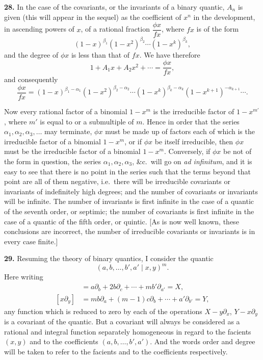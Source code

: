 \documentclass[11pt]{article}
\begin{document}
\textbf{28.} In the case of the covariants, or the invariants of a binary quantic, $A_n$ is given (this will appear in the sequel) as the coefficient of $x^n$ in the development, in ascending powers of $x$, of a rational fraction $\dfrac{\phi x}{f x}$, where $f x$ is of the form
\[
(1 - x)^{\beta_1}(1 - x^2)^{\beta_2}\cdots(1 - x^k)^{\beta_k},
\]
and the degree of $\phi x$ is less than that of $f x$. We have therefore
\[
1 + A_1 x + A_2 x^2 + \cdots = \frac{\phi x}{f x},
\]
and consequently
\[
\frac{\phi x}{f x} = (1 - x)^{\beta_1 - \alpha_1}(1 - x^2)^{\beta_2 - \alpha_2}\cdots(1 - x^k)^{\beta_k - \alpha_k}(1 - x^{k+1})^{-\alpha_{k+1}}\cdots.
\]

Now every rational factor of a binomial $1 - x^m$ is the irreducible factor of $1 - x^{m'}$, where $m'$ is equal to or a submultiple of $m$. Hence in order that the series $\alpha_1, \alpha_2, \alpha_3, \ldots$ may terminate, $\phi x$ must be made up of factors each of which is the irreducible factor of a binomial $1 - x^m$, or if $\phi x$ be itself irreducible, then $\phi x$ must be the irreducible factor of a binomial $1 - x^m$. Conversely, if $\phi x$ be not of the form in question, the series $\alpha_1, \alpha_2, \alpha_3$, \&c.\ will go on \emph{ad infinitum}, and it is easy to see that there is no point in the series such that the terms beyond that point are all of them negative, i.e.\ there will be irreducible covariants or invariants of indefinitely high degrees; and the number of covariants or invariants will be infinite. The number of invariants is first infinite in the case of a quantic of the seventh order, or septimic; the number of covariants is first infinite in the case of a quantic of the fifth order, or quintic. [As is now well known, these conclusions are incorrect, the number of irreducible covariants or invariants is in every case finite.]

\textbf{29.} Resuming the theory of binary quantics, I consider the quantic
\[
(a, b, \ldots, b', a' \mid x, y)^m.
\]
Here writing
\begin{align*}
[y\partial_x] &= a\partial_b + 2 b\partial_c + \cdots + m b'\partial_{a'} = X, \\
[x\partial_y] &= m b\partial_a + (m-1)c\partial_b + \cdots + a'\partial_{b'} = Y,
\end{align*}
any function which is reduced to zero by each of the operations $X - y\partial_x$, $Y - x\partial_y$ is a covariant of the quantic. But a covariant will always be considered as a rational and integral function separately homogeneous in regard to the facients $(x, y)$ and to the coefficients $(a, b, \ldots, b', a')$. And the words order and degree will be taken to refer to the facients and to the coefficients respectively.
\end{document}
